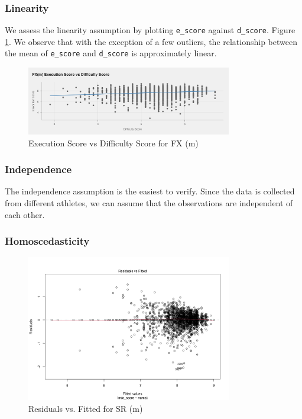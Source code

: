 \documentclass{article}
\begin{document}
\subsubsection{Linearity}
We assess the linearity assumption by plotting \texttt{e\_score} against \texttt{d\_score}. 
Figure \ref{fig:fx_m}. We observe that with the exception of a few outliers, the relationship
between the mean of \texttt{e\_score} and \texttt{d\_score} is approximately linear.
\begin{figure}[H]
   \centering 
   \includegraphics[width=0.8\textwidth]{../plots/fx_m_d_e.png}
   \caption{Execution Score vs Difficulty Score for FX (m)}
   \label{fig:fx_m}
\end{figure}

\subsubsection{Independence}
The independence assumption is the easiest to verify. Since the data is collected 
from different athletes, we can assume that the observations are independent of each other.

\subsubsection{Homoscedasticity}
\begin{figure}[H]
    \centering
    \includegraphics[width=0.8\textwidth]{../plots/m_resid_sr.png}
    \caption{Residuals vs. Fitted for SR (m)}
    \label{fig:sr_m_resid}
\end{figure}
\end{document}
